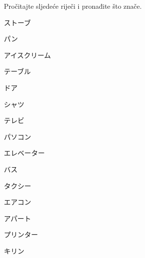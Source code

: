 
\author{Tomislav Mamić}

	
	\begin{mondai}{Pročitajte sljedeće riječi i pronađite što znače.}
		\item ストーブ
		\item パン
		\item アイスクリーム
		\item テーブル
		\item ドア
		\item シャツ
		\item テレビ
		\item パソコン
		\item エレベーター
		\item バス
		\item タクシー
		\item エアコン
		\item アパート
		\item プリンター
		\item キリン
	\end{mondai}

